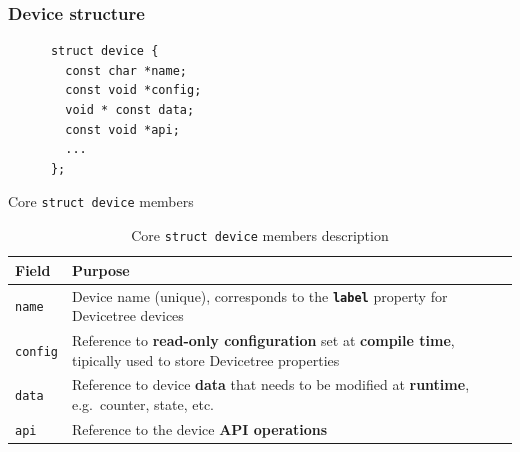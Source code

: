\documentclass[handout]{beamer}
\begin{document}
\begin{frame}[fragile]
  \frametitle{Device structure}

  \begin{listing}[H]
    \begin{verbatim}
      struct device {
        const char *name;
        const void *config;
        void * const data;
        const void *api;
        ...
      };
    \end{verbatim}
    \caption{Core \texttt{struct device} members}
  \end{listing}

  \begin{table}
    \centering
    \footnotesize
    \begin{tabular}{lp{}}
      \toprule
      Field           & Purpose                                            \\
      \midrule
      \texttt{name}   &                                                    %
      Device name (unique), corresponds to the \textbf{\texttt{label}}
      property for Devicetree devices                                      \\
      \texttt{config} &                                                    %
      Reference to \textbf{read-only configuration} set at
      \textbf{compile time}, tipically used to store Devicetree properties \\
      \texttt{data}   &                                                    %
      Reference to device \textbf{data} that needs to be modified at
      \textbf{runtime}, e.g.\ counter, state, etc.                         \\
      \texttt{api}    &                                                    %
      Reference to the device \textbf{API operations}                      \\
      \bottomrule
    \end{tabular}
    \caption{Core \texttt{struct device} members description}
  \end{table}
\end{frame}
\end{document}
